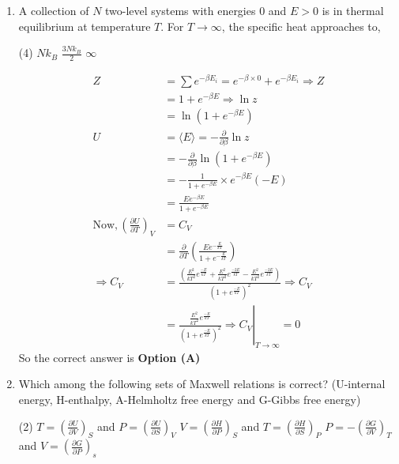 \begin{enumerate}
\item A collection of $N$ two-level systems with energies 0 and $E>0$ is in thermal
equilibrium at temperature $T$. For $T \rightarrow \infty$, the specific heat approaches to,
\begin{tasks}(4)
	\task[\textbf{B.}] $N k_{B}$
	\task[\textbf{C.}] $\frac{3 N k_{B}}{2}$
	\task[\textbf{D.}] $\infty$
\end{tasks}
\begin{answer}
	$$\begin{aligned}	
	Z&=\sum e^{-\beta E_{i}}=e^{-\beta \times 0}+e^{-\beta E_{i}} \Rightarrow Z\\&=1+e^{-\beta E} \Rightarrow \ln z\\&=\ln \left(1+e^{-\beta E}\right)\\
	U&=\langle E\rangle=-\frac{\partial}{\partial \beta} \ln z\\&=-\frac{\partial}{\partial \beta} \ln \left(1+e^{-\beta E}\right)\\&=-\frac{1}{1+e^{-\beta E}} \times e^{-\beta E}(-E)\\&=\frac{E e^{-\beta E}}{1+e^{-\beta E}}\\
	\text{Now},\left(\frac{\partial U}{\partial T}\right)_{V}&=C_{V}\\
	&=\frac{\partial}{\partial T}\left(\frac{E e^{-\frac{E}{k T}}}{1+e^{-\frac{E}{k T}}}\right)\\
	\Rightarrow C_{V}&=\frac{\left(\frac{E^{2}}{k T^{2}} e^{\frac{-E}{k T}}+\frac{E^{2}}{k T^{2}} e^{\frac{-2 E}{k T}}-\frac{E^{2}}{k T^{2}} e^{\frac{-2 E}{k T}}\right)}{\left(1+e^{\frac{-E}{k T}}\right)^{2}} \Rightarrow C_{V}\\
	&=\left.\frac{\frac{E^{2}}{k T^{2}} e^{\frac{-E}{k T}}}{\left(1+e^{\frac{-E}{k T}}\right)^{2}} \Rightarrow C_{V}\right|_{T \rightarrow \infty}=0
	\end{aligned}$$	
	So the correct answer is \textbf{Option (A)}
\end{answer}
\item Which among the following sets of Maxwell relations is correct? (U-internal energy, H-enthalpy, A-Helmholtz free energy and G-Gibbs free energy)
{	}
\begin{tasks}(2)
	\task[\textbf{A.}] $T=\left(\frac{\partial U}{\partial V}\right)_{S}$ and $P=\left(\frac{\partial U}{\partial S}\right)_{V}$
	\task[\textbf{B.}] $V=\left(\frac{\partial H}{\partial P}\right)_{S}$ and $T=\left(\frac{\partial H}{\partial S}\right)_{P}$
	\task[\textbf{C.}]  $P=-\left(\frac{\partial G}{\partial V}\right)_{T}$ and $V=\left(\frac{\partial G}{\partial P}\right)_{s}$

\end{tasks}
\end{enumerate}
